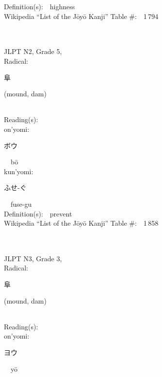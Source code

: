 \begin{multicols}{2}
Definition(s):\ \ highness \\
Wikipedia ``List of the J\=oy\=o Kanji'' Table \#:\ \ 1\,794 \\
\ \ \\
{\fontsize{34pt}{40pt}  }\ \ \\  %
{JLPT N2, Grade 5, \\Radical:\ \ {\begin{CJK}{UTF8}{min} 阜 \end{CJK}} (mound, dam) } \\
Reading(s):\ \ \\
{\hspace*{1em}}on'yomi:\ \ \\
{\hspace*{2em}}{\begin{CJK}{UTF8}{min} ボウ \end{CJK}}\ \ b\=o\ \ \\
{\hspace*{1em}}kun'yomi:\ \ \\
{\hspace*{2em}}{\begin{CJK}{UTF8}{min} ふせ-ぐ \end{CJK}}\ \ fuse-gu\ \ \\
Definition(s):\ \ prevent \\
Wikipedia ``List of the J\=oy\=o Kanji'' Table \#:\ \ 1\,858 \\
\ \ \\
{\fontsize{34pt}{40pt}  }\ \ \\  %
{JLPT N3, Grade 3, \\Radical:\ \ {\begin{CJK}{UTF8}{min} 阜 \end{CJK}} (mound, dam) } \\
Reading(s):\ \ \\
{\hspace*{1em}}on'yomi:\ \ \\
{\hspace*{2em}}{\begin{CJK}{UTF8}{min} ヨウ \end{CJK}}\ \ y\=o\ \ \\

\end{multicols}
